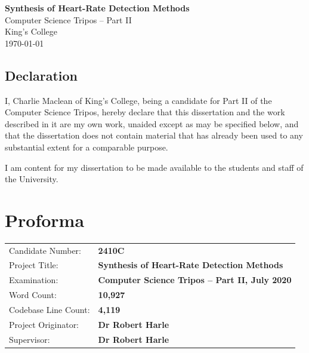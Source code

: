 \documentclass[12pt,a4paper,twoside,openany]{report}
\begin{document}





\pagestyle{empty}


\vspace*{60mm}
\begin{center}
\Huge
\textbf{Synthesis of Heart-Rate Detection Methods} \\[5mm]
Computer Science Tripos -- Part II \\[5mm]
King's College \\[5mm]
\today  %
\end{center}

\newpage

\section*{Declaration}

I, Charlie Maclean of King's College, being a candidate for Part II of the 
Computer Science Tripos, hereby declare that this dissertation and the work 
described in it are my own work, unaided except as may be specified below, 
and that the dissertation does not contain material that has already been 
used to any substantial extent for a comparable purpose.

I am content for my dissertation to be made available to the students and staff
of the University. 

\bigskip
{}

\medskip
{}


\pagestyle{plain}

\chapter*{Proforma}

{\large
\begin{tabular}{ll}
Candidate Number:               & \bf 2410C    	                   	\\
Project Title:      & \bf Synthesis of Heart-Rate Detection Methods	\\
Examination:        & \bf Computer Science Tripos -- Part II, July 2020 \\
Word Count:         & \bf 10,927					\\
Codebase Line Count:& \bf 4,119\footnotemark[1]				\\
Project Originator: & \bf Dr Robert Harle                   		\\
Supervisor:         & \bf Dr Robert Harle                   		\\ 
\end{tabular}
}
\end{document}

